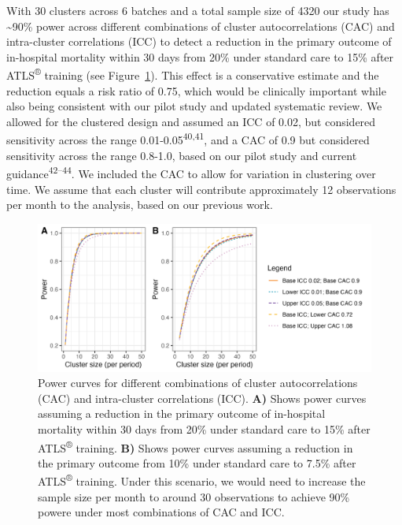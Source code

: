 \documentclass[
]{scrartcl}
\begin{document}
With 30 clusters across 6 batches and a total sample size of 4320 our
study has \textasciitilde90\% power across different combinations of
cluster autocorrelations (CAC) and intra-cluster correlations (ICC) to
detect a reduction in the primary outcome of in-hospital mortality
within 30 days from 20\% under standard care to 15\% after
ATLS\textsuperscript{®} training (see Figure~\ref{fig-power-curves}).
This effect is a conservative estimate and the reduction equals a risk
ratio of 0.75, which would be clinically important while also being
consistent with our pilot study and updated systematic review. We
allowed for the clustered design and assumed an ICC of 0.02, but
considered sensitivity across the range
0.01-0.05\textsuperscript{40,41}, and a CAC of 0.9 but considered
sensitivity across the range 0.8-1.0, based on our pilot study and
current guidance\textsuperscript{42--44}. We included the CAC to allow
for variation in clustering over time. We assume that each cluster will
contribute approximately 12 observations per month to the analysis,
based on our previous work.

\begin{figure}

{\centering \includegraphics[width=7.08in,height=\textheight]{./combined-power-curves.png}

}

\caption{\label{fig-power-curves}Power curves for different combinations
of cluster autocorrelations (CAC) and intra-cluster correlations (ICC).
\textbf{A)} Shows power curves assuming a reduction in the primary
outcome of in-hospital mortality within 30 days from 20\% under standard
care to 15\% after ATLS\textsuperscript{®} training. \textbf{B)} Shows
power curves assuming a reduction in the primary outcome from 10\% under
standard care to 7.5\% after ATLS\textsuperscript{®} training. Under
this scenario, we would need to increase the sample size per month to
around 30 observations to achieve 90\% powere under most combinations of
CAC and ICC.}

\end{figure}
\end{document}
